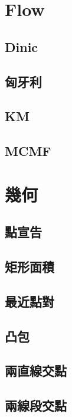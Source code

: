 \documentclass[a4paper,10pt,twocolumn,oneside]{article}
\begin{document}
\section{Flow}
\subsection{Dinic}

\subsection{匈牙利}

\subsection{KM}

\subsection{MCMF}

\section{幾何}
\subsection{點宣告}

\subsection{矩形面積}

\subsection{最近點對}

\subsection{凸包}

\subsection{兩直線交點}

\subsection{兩線段交點}

\end{document}
